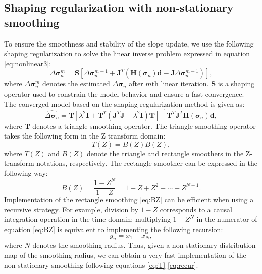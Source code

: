 \subsection{Shaping regularization with non-stationary smoothing}
To ensure the smoothness and stability of the slope update, we use the following shaping regularization to solve the linear inverse problem expressed in equation \ref{eq:nonlinear3}:
\begin{equation}
\label{eq:linear}
\Delta \boldsymbol{\sigma}_n^{m} = \mathbf{S}\left[ \Delta \boldsymbol{\sigma}_n^{m-1} + \mathbf{J}^T\left( \mathbf{H}(\boldsymbol{\sigma}_n)\mathbf{d} - \mathbf{J}\Delta \boldsymbol{\sigma}_n^{m-1}\right)\right],
\end{equation}
where $\Delta \boldsymbol{\sigma}_n^{m}$ denotes the estimated $\Delta \boldsymbol{\sigma}_n$ after $m$th linear iteration. $\mathbf{S}$ is a shaping operator used to constrain the model behavior and ensure a fast convergence. The converged model based on the shaping regularization method is given as:
\begin{equation}
\label{eq:shape}
\hat{\Delta \boldsymbol{\sigma}_n} = \mathbf{T}[\lambda^2\mathbf{I} + \mathbf{T}^T(\mathbf{J}^T\mathbf{J}-\lambda^2\mathbf{I})\mathbf{T}]^{-1}\mathbf{T}^T\mathbf{J}^T\mathbf{H}(\boldsymbol{\sigma}_n)\mathbf{d},
\end{equation}
where $\mathbf{T}$ denotes a triangle smoothing operator.  The triangle smoothing operator takes the following form in the Z transform domain:
\begin{equation}
\label{eq:T}
T(Z) = B(Z)B(Z),
\end{equation} 
where $T(Z)$ and $B(Z)$ denote the triangle and rectangle smoothers in the Z-transform notations, respectively. The rectangle smoother can be expressed in the following way:
\begin{equation}
\label{eq:BZ}
B(Z)=\frac{1-Z^N}{1-Z} = 1 + Z + Z^2 +\cdots + Z^{N-1}.
\end{equation} 
Implementation of the rectangle smoothing \ref{eq:BZ} can be efficient when using a recursive strategy. For example, division by $1-Z$ corresponds to a causal integration operation in the time domain; multiplying  $1-Z^N$ in the numerator of equation \ref{eq:BZ} is equivalent to implementing the following recursion:
\begin{equation}
\label{eq:recur}
y_n = x_1 - x_{N},
\end{equation}
where $N$ denotes the smoothing radius. Thus, given a non-stationary distribution map of the smoothing radius, we can obtain a very fast implementation of the non-stationary smoothing following equations \ref{eq:T}-\ref{eq:recur}. 

